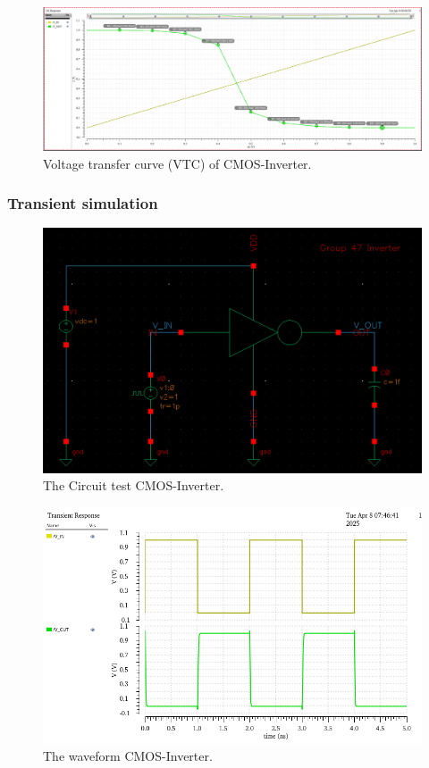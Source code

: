 \begin{figure}[H]
	\centering
	\includegraphics[width=.6\linewidth]{section/EX1/INV/EX1_INV_DCanalysis_vtc.png}
	\caption{Voltage transfer curve (VTC) of CMOS-Inverter.}
	\label{f_EX1_INV_DCanalysis_vtc}
\end{figure}

\subsubsection{Transient simulation}

\begin{figure}[H]
	\centering
	\includegraphics[width=.6\linewidth]{section/EX1/INV/EX1_INV_Trans_schematic.png}
	\caption{The Circuit test CMOS-Inverter.}
\end{figure}

\begin{figure}[H]
	\centering
	\includegraphics[width=.6\linewidth]{section/EX1/INV/EX1_INV_waveform.png}
	\caption{The waveform CMOS-Inverter.}
	\label{f_EX1_INV_waveform}
\end{figure}

